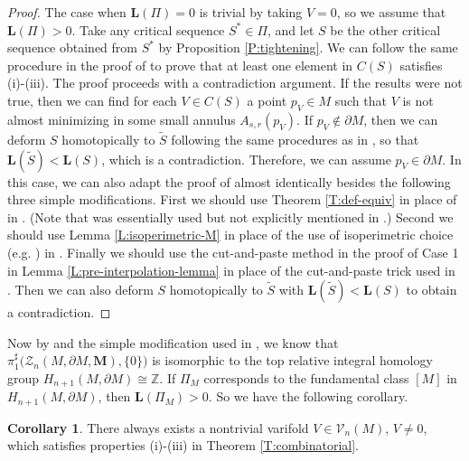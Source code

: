 \documentclass[10pt]{amsart}
\theoremstyle{definition}
\newtheorem{corollary}[theorem]{Corollary}
\theoremstyle{remark}
\numberwithin{equation}{section}
\newcommand{\V}{\mathcal{V}}
\newcommand{\ti}{\tilde}
\newcommand{\Z}{\mathcal{Z}}
\newcommand{\M}{\mathbf{M}}
\newcommand{\bL}{\mathbf{L}}
\begin{document}
\begin{proof}
The case when $\bL(\Pi)=0$ is trivial by taking $V=0$, so we assume that $\bL(\Pi)>0$. Take any critical sequence $S^*\in\Pi$, and let $S$ be the other critical sequence obtained from $S^*$ by Proposition \ref{P:tightening}. We can follow the same procedure in the proof of \cite[Theorem 4.10]{Pitts} to prove that at least one element in $C(S)$ satisfies (i)-(iii). The proof proceeds with a  contradiction argument. If the results were not true, then we can find for each $V\in C(S)$ a point $p_V \in M$ such that $V$ is not almost minimizing in some small annulus $A_{s,r}(p_V)$. If $p_V \notin \partial M$, then we can deform $S$ homotopically to $\ti{S}$ following the same procedures as in \cite[Theorem 4.10]{Pitts}, so that $\bL(\ti{S})<\bL(S)$, which is a contradiction. Therefore, we can assume $p_V\in\partial M$. In this case, we can also adapt the proof of \cite[Theorem 4.10]{Pitts} almost identically besides the following three simple modifications. First we should use Theorem \ref{T:def-equiv} in place of \cite[Theorem 3.9]{Pitts} in \cite[page 164, Part 2]{Pitts}. (Note that \cite[Theorem 3.9]{Pitts} was essentially used but not explicitly mentioned in \cite[page 164, Part 2]{Pitts}.) Second we should use Lemma \ref{L:isoperimetric-M} in place of the use of isoperimetric choice (e.g. \cite[Corollary 1.14]{Almgren62}) in \cite[page 165, Part 5(c)]{Pitts}. Finally we should use the cut-and-paste method in the proof of Case 1 in Lemma \ref{L:pre-interpolation-lemma} in place of the cut-and-paste trick used in \cite[page 166, Part 9]{Pitts}. Then we can also deform $S$ homotopically to $\ti{S}$ with $\bL(\ti{S})<\bL(S)$ to obtain a contradiction.
\end{proof}

Now by \cite[Theorem 7.5]{Almgren62} and the simple modification used in \cite[Theorem 4.6]{Pitts}, we know that $\pi^{\sharp}_1\big(\Z_{n}(M, \partial M, \M), \{0\}\big)$ is isomorphic to the top relative integral homology group $H_{n+1}(M, \partial M) \cong \mathbb{Z}$. If $\Pi_M$ corresponds to the fundamental class $[M]$ in $H_{n+1}(M, \partial M)$, then $\bL(\Pi_M)>0$. So we have the following corollary.

\begin{corollary}
\label{C: existence of almost minimizing varifold}
There always exists a nontrivial varifold $V\in\V_n(M)$, $V\neq 0$, which satisfies properties (i)-(iii) in Theorem \ref{T:combinatorial}.
\end{corollary}
\end{document}
